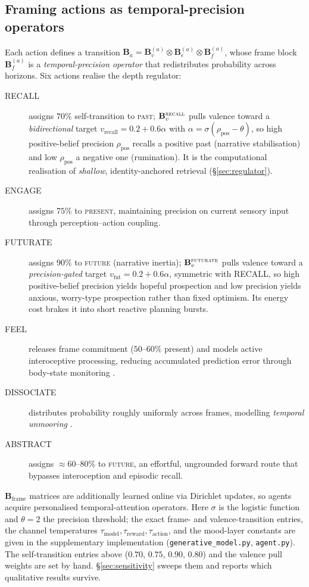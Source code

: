 \documentclass[11pt,a4paper]{article}
\begin{document}
\subsection{Framing actions as temporal-precision operators}
Each action defines a transition $\mathbf B_a=\mathbf B_v^{(a)}\otimes\mathbf
B_e^{(a)}\otimes\mathbf B_f^{(a)}$, whose frame block $\mathbf B_f^{(a)}$ is a
\emph{temporal-precision operator} that redistributes probability across horizons. Six
actions realise the depth regulator:
\begin{description}
\item[RECALL] assigns $70\%$ self-transition to \textsc{past}; $\mathbf B_v^{\textsc{recall}}$
pulls valence toward a \emph{bidirectional} target $v_{\text{recall}}=0.2+0.6\alpha$
with $\alpha=\sigma(\rho_{\text{pos}}-\theta)$, so high positive-belief precision
$\rho_{\text{pos}}$ recalls a positive past (narrative stabilisation) and low
$\rho_{\text{pos}}$ a negative one (rumination). It is the computational realisation of
\emph{shallow}, identity-anchored retrieval (\S\ref{sec:regulator}).
\item[ENGAGE] assigns $75\%$ to \textsc{present}, maintaining precision on current
sensory input through perception--action coupling.
\item[FUTURATE] assigns $90\%$ to \textsc{future} (narrative inertia); $\mathbf
B_v^{\textsc{futurate}}$ pulls valence toward a \emph{precision-gated} target
$v_{\text{fut}}=0.2+0.6\alpha$, symmetric with RECALL, so high positive-belief
precision yields hopeful prospection and low precision yields anxious, worry-type
prospection rather than fixed optimism. Its energy cost brakes it into short reactive
planning bursts.
\item[FEEL] releases frame commitment ($50$--$60\%$ present) and models active
interoceptive processing, reducing accumulated prediction error through body-state
monitoring \citep{stephan2016allostatic}.
\item[DISSOCIATE] distributes probability roughly uniformly across frames, modelling
\emph{temporal unmooring} \citep{vannikov2018dissociation}.
\item[ABSTRACT] assigns $\approx60$--$80\%$ to \textsc{future}, an effortful,
ungrounded forward route that bypasses interoception and episodic recall.
\end{description}
$\mathbf B_{\text{frame}}$ matrices are additionally learned online via Dirichlet
updates, so agents acquire personalised temporal-attention operators. Here $\sigma$ is
the logistic function and $\theta=2$ the precision threshold; the exact frame- and
valence-transition entries, the channel temperatures $\tau_{\text{model}},
\tau_{\text{reward}}, \tau_{\text{action}}$, and the mood-layer constants are given in
the supplementary implementation (\texttt{generative\_model.py}, \texttt{agent.py}).
The self-transition entries above ($0.70$, $0.75$, $0.90$, $0.80$) and the valence pull
weights are set by hand. \S\ref{sec:sensitivity} sweeps them and reports which
qualitative results survive.
\end{document}
